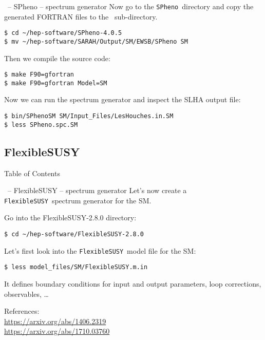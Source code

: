 \documentclass[11pt]{beamer}
\newcommand{\FlexibleSUSY}{\texttt{FlexibleSUSY}}
\newcommand{\SM}{\text{SM}}
\newcommand{\SPheno}{\texttt{SPheno}}
\begin{document}

\begin{frame}[fragile]{\insertsection\ -- SPheno -- spectrum generator}
  Now go to the \SPheno\ directory and copy the generated FORTRAN
  files to the \SM\ sub-directory.
  \begin{lstlisting}
$ cd ~/hep-software/SPheno-4.0.5
$ mv ~/hep-software/SARAH/Output/SM/EWSB/SPheno SM\end{lstlisting}%
  Then we compile the source code:
  \begin{lstlisting}
$ make F90=gfortran
$ make F90=gfortran Model=SM\end{lstlisting}%
  Now we can run the spectrum generator and inspect the SLHA output file:
  \begin{lstlisting}
$ bin/SPhenoSM SM/Input_Files/LesHouches.in.SM
$ less SPheno.spc.SM\end{lstlisting}
\end{frame}


\subsection{FlexibleSUSY}


\begin{frame}{Table of Contents}
\end{frame}


\begin{frame}[fragile]{\insertsection\ -- FlexibleSUSY -- spectrum generator}
  Let's now create a \FlexibleSUSY\ spectrum generator for the SM.

  \bigskip

  Go into the FlexibleSUSY-2.8.0 directory:
  \begin{lstlisting}
$ cd ~/hep-software/FlexibleSUSY-2.8.0\end{lstlisting}%
  Let's first look into the \FlexibleSUSY\ model file for the SM:
  \begin{lstlisting}
$ less model_files/SM/FlexibleSUSY.m.in\end{lstlisting}%
  It defines boundary conditions for input and output parameters, loop
  corrections, observables, \ldots

  \bigskip

  References:\\
  \url{https://arxiv.org/abs/1406.2319}\\
  \url{https://arxiv.org/abs/1710.03760}

\end{frame}
\end{document}

